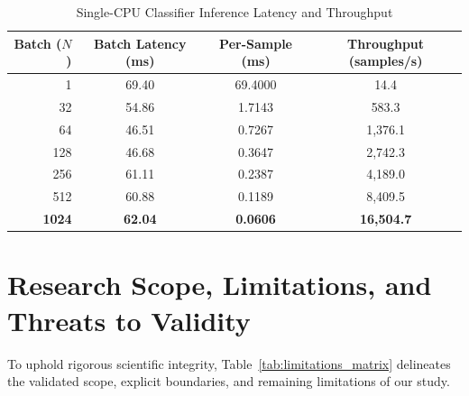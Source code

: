 \documentclass[10pt,journal,compsoc,twocolumn]{IEEEtran}
\begin{document}
\begin{table}[htbp]
\caption{Single-CPU Classifier Inference Latency and Throughput}
\label{tab:runtime_benchmarks}
\centering
\begin{tabular}{rccc}
\toprule
\textbf{Batch ($N$)} & \textbf{Batch Latency (ms)} & \textbf{Per-Sample (ms)} & \textbf{Throughput (samples/s)} \\
\midrule
1 & 69.40 & 69.4000 & 14.4 \\
32 & 54.86 & 1.7143 & 583.3 \\
64 & 46.51 & 0.7267 & 1,376.1 \\
128 & 46.68 & 0.3647 & 2,742.3 \\
256 & 61.11 & 0.2387 & 4,189.0 \\
512 & 60.88 & 0.1189 & 8,409.5 \\
\textbf{1024} & \textbf{62.04} & \textbf{0.0606} & \textbf{16,504.7} \\
\bottomrule
\end{tabular}
\end{table}

\section{Research Scope, Limitations, and Threats to Validity}
To uphold rigorous scientific integrity, Table~\ref{tab:limitations_matrix} delineates the validated scope, explicit boundaries, and remaining limitations of our study.
\end{document}
